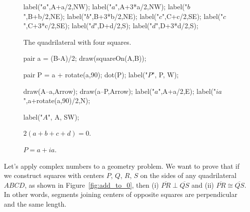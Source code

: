 \documentclass[../textbook.tex]{subfiles}
\begin{document}
\begin{figure}[h]
\begin{center}
\begin{minipage}[b]{0.35\textwidth}
\begin{center}
\begin{minipage}[b]{\textwidth}
\begin{asy}[width=0.6\textwidth]
						label("$a$",A+a/2,NW);
						label("$a$",A+3*a/2,NW);
						label("$b$",B+b/2,NE);
						label("$b$",B+3*b/2,NE);
						label("$c$",C+c/2,SE);
						label("$c$",C+3*c/2,SE);
						label("$d$",D+d/2,S);
						label("$d$",D+3*d/2,S);
						
					\end{asy}
				\end{minipage}
			\end{center}
			\vspace*{-2\baselineskip}
			\begin{center}
				\begin{minipage}[t]{\textwidth}
					\caption{The quadrilateral with four squares.}
					\label{fig:quad_square}
				\end{minipage}
			\end{center}
		
			\begin{center}
				\begin{minipage}[b]{\textwidth}
					\centering
					\begin{asy}[width=0.6\textwidth]
					
						pair a = (B-A)/2;
						draw(squareOn(A,B));
						
						pair P = a + rotate(a,90);
						dot(P);
						label("$P$", P, W);
						
						draw(A--a,Arrow);
						draw(a--P,Arrow);
						label("$a$",A+a/2,E);
						label("$ia$",a+rotate(a,90)/2,N);
						
						label("$A$", A, SW);
					\end{asy}
				\end{minipage}
			\end{center}
		\end{minipage}
	\end{center}
	\vspace*{-2\baselineskip}
	\begin{center}
		\begin{minipage}[t]{0.55\textwidth}
			\caption{$2(a+b+c+d)=0$.}
			\label{fig:add_to_0}
		\end{minipage}
		\hfill
		\begin{minipage}[t]{0.35\textwidth}
			\caption{$P=a+ia$.}
			\label{fig:p_def_on_a}
		\end{minipage}
	\end{center}
	\vspace*{-2\baselineskip}
\end{figure}


\noindent Let’s apply complex numbers to a geometry problem. We want to prove that if we construct squares with centers $P$, $Q$, $R$, $S$ on the sides of any quadrilateral $ABCD$, as shown in Figure~\ref{fig:add_to_0}, then (i) $\overline{PR} \perp \overline{QS}$ and (ii) $\overline{PR} \cong \overline{QS}$. In other words, segments joining centers of opposite squares are perpendicular and the same length.
\end{document}
